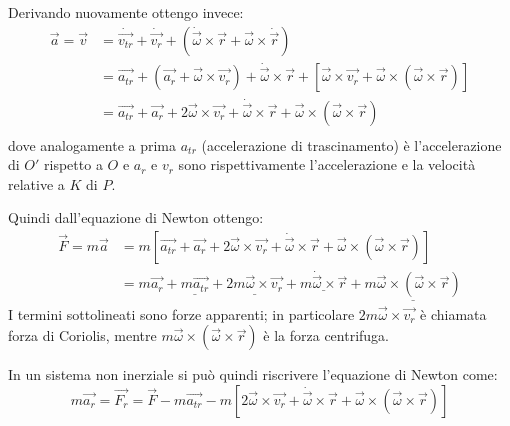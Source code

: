 \documentclass[../main.tex]{subfiles}
\begin{document}
Derivando nuovamente ottengo invece:
\begin{equation}\label{AccNonInerziale}
\begin{split}
	\vec{a}=\vec{v}	& =\dot{\overrightarrow{v_{tr}}}+\dot{\vec{v_r}}+\left(\dot{\vec{\omega}}\times\vec{r}+\vec{\omega}\times\dot{\vec{r}}\right)\\
											& =\overrightarrow{a_{tr}}+\left(\vec{a_r}+\vec{\omega}\times\vec{v_r}\right)+\dot{\vec{\omega}}\times\vec{r}+\left[\vec{\omega}\times\vec{v_r}+\vec{\omega}\times(\vec{\omega}\times\vec{r})\right]\\
											& =\overrightarrow{a_{tr}}+\vec{a_r}+2\vec{\omega}\times\vec{v_r}+\dot{\vec{\omega}}\times\vec{r}+\vec{\omega}\times(\vec{\omega}\times\vec{r})\\
\end{split}
\end{equation}
dove analogamente a prima $a_{tr}$ (accelerazione di trascinamento) è l'accelerazione di $O'$ rispetto a $O$ e $a_r$ e 
$v_r$ sono rispettivamente l'accelerazione e la velocità relative a $K$ di $P$.

Quindi dall'equazione di Newton ottengo:
\begin{equation*}
\begin{split}
	\vec{F}=m\vec{a}	& =m\left[\overrightarrow{a_{tr}}+\vec{a_r}+2\vec{\omega}\times\vec{v_r}+\dot{\vec{\omega}}\times\vec{r}+\vec{\omega}\times(\vec{\omega}\times\vec{r})\right]\\
											& =m\vec{a_r}+\underline{m\overrightarrow{a_{tr}}}+\underline{2m\vec{\omega}\times\vec{v_r}}+\underline{m\dot{\vec{\omega}}\times\vec{r}}+\underline{m\vec{\omega}\times(\vec{\omega}\times\vec{r})}
\end{split}
\end{equation*}
I termini sottolineati sono forze apparenti; in particolare $2m\vec{\omega}\times\vec{v_r}$
è chiamata forza di Coriolis, mentre $m\vec{\omega}\times(\vec{\omega}\times\vec{r})$
è la forza centrifuga.

In un sistema non inerziale si può quindi riscrivere l'equazione di Newton come:
\begin{equation}\label{ForzaNonInerziale}
	m\vec{a_r}=\vec{F_r}=\vec{F}-m\overrightarrow{a_{tr}}-m\left[2\vec{\omega}\times\vec{v_r}+\dot{\vec{\omega}}\times\vec{r}+\vec{\omega}\times(\vec{\omega}\times\vec{r})\right]
\end{equation}
\end{document}
